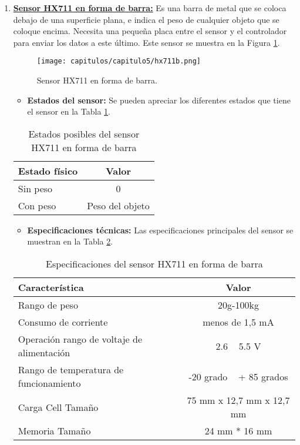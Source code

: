 \begin{enumerate}
\item \underline{\textbf{Sensor HX711 en forma de barra:}} Es una barra de metal que se coloca debajo de una superficie plana, e indica el peso de cualquier objeto que se coloque encima. Necesita una pequeña placa entre el sensor y el controlador para enviar los datos a este último. Este sensor se muestra en la Figura \ref{fig:hx711b}.

\begin{figure}[h] 
    \centering
    \texttt{[image: capitulos/capitulo5/hx711b.png]}
    \caption{Sensor HX711 en forma de barra.}
    \label{fig:hx711b}
\end{figure}

\newpage
\begin{itemize}
    \item \textbf{Estados del sensor:} Se pueden apreciar los diferentes estados que tiene el sensor en la Tabla \ref{tab:hx711b}.
\end{itemize}

\begin{table}[h]
    \centering
    \begin{tabular}{|l|c|}
        \rowcolor[gray]{.5}
        \hline
         \color{white}Estado físico&\color{white}Valor\\
         \hline
         Sin peso&0 \\
         \hline
         Con peso&Peso del objeto  \\
         \hline
    \end{tabular}
    \caption{Estados posibles del sensor HX711 en forma de barra}
    \label{tab:hx711b}
\end{table}

\begin{itemize}
    \item \textbf{Especificaciones técnicas:} Las especificaciones principales del sensor se muestran en la Tabla \ref{tab:hx711besp}.
\end{itemize}

\begin{table}[h]
    \centering
    \begin{tabular}{|l|c|}
        \rowcolor[gray]{.5}
        \hline
            \color{white}Característica&\color{white}Valor  \\
        \hline
            Rango de peso & 20g-100kg \\
        \hline    
            Consumo de corriente & menos de 1,5 mA  \\
        \hline   
            Operación rango de voltaje de alimentación & 2.6 ~ 5.5 V  \\
        \hline    
            Rango de temperatura de funcionamiento & -20 grado ~ + 85 grados  \\
        \hline    
            Carga Cell Tamaño & 75 mm x 12,7 mm x 12,7 mm  \\
        \hline    
            Memoria Tamaño & 24 mm * 16 mm  \\
         \hline
    \end{tabular}
    \caption{Especificaciones del sensor HX711 en forma de barra}
    \label{tab:hx711besp}
\end{table}


\end{enumerate}
